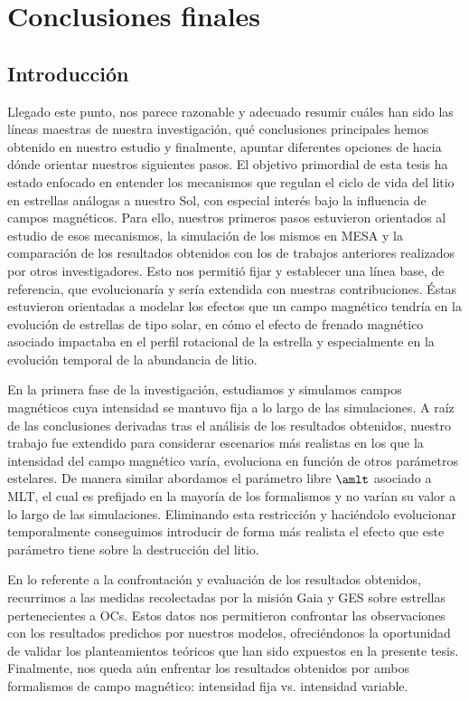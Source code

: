 
\chapter{Conclusiones finales}\label{ch:noveno-capitulo}

\section{Introducción}
Llegado este punto, nos parece razonable y adecuado resumir cuáles han sido las líneas maestras de nuestra investigación, qué conclusiones principales hemos obtenido en nuestro estudio y finalmente, apuntar diferentes opciones de hacia dónde orientar nuestros siguientes pasos. El objetivo primordial de esta tesis ha estado enfocado en entender los mecanismos que regulan el ciclo de vida del litio en estrellas análogas a nuestro Sol, con especial interés bajo la influencia de campos magnéticos. Para ello, nuestros primeros pasos estuvieron orientados al estudio de esos mecanismos, la simulación de los mismos en MESA y la comparación de los resultados obtenidos con los de trabajos anteriores realizados por otros investigadores. Esto nos permitió fijar y establecer una línea base, de referencia, que evolucionaría y sería extendida con nuestras contribuciones. Éstas estuvieron orientadas a modelar los efectos que un campo magnético tendría en la evolución de estrellas de tipo solar, en cómo el efecto de frenado magnético asociado impactaba en el perfil rotacional de la estrella y especialmente en la evolución temporal de la abundancia de litio.

En la primera fase de la investigación, estudiamos y simulamos campos magnéticos cuya intensidad se mantuvo fija a lo largo de las simulaciones. A raíz de las conclusiones derivadas tras el análisis de los resultados obtenidos, nuestro trabajo fue extendido para considerar escenarios más realistas en los que la intensidad del campo magnético varía, evoluciona en función de otros parámetros estelares. De manera similar abordamos el parámetro libre $\amlt$ asociado a MLT, el cual es prefijado en la mayoría de los formalismos y no varían su valor a lo largo de las simulaciones. Eliminando esta restricción y haciéndolo evolucionar temporalmente conseguimos introducir de forma más realista el efecto que este parámetro tiene sobre la destrucción del litio.

En lo referente a la confrontación y evaluación de los resultados obtenidos, recurrimos a las medidas recolectadas por la misión Gaia y GES sobre estrellas pertenecientes a OCs. Estos datos nos permitieron confrontar las observaciones con los resultados predichos por nuestros modelos, ofreciéndonos la oportunidad de validar los planteamientos teóricos que han sido expuestos en la presente tesis. Finalmente, nos queda aún enfrentar los resultados obtenidos por ambos formalismos de campo magnético: intensidad fija vs. intensidad variable. 


